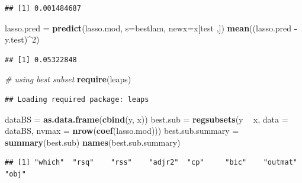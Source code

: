 \documentclass[]{article}
\newenvironment{Shaded}{\begin{snugshade}}{\end{snugshade}}
\newcommand{\KeywordTok}[1]{\textcolor[rgb]{0.13,0.29,0.53}{\textbf{#1}}}
\newcommand{\DataTypeTok}[1]{\textcolor[rgb]{0.13,0.29,0.53}{#1}}
\newcommand{\DecValTok}[1]{\textcolor[rgb]{0.00,0.00,0.81}{#1}}
\newcommand{\StringTok}[1]{\textcolor[rgb]{0.31,0.60,0.02}{#1}}
\newcommand{\CommentTok}[1]{\textcolor[rgb]{0.56,0.35,0.01}{\textit{#1}}}
\newcommand{\OperatorTok}[1]{\textcolor[rgb]{0.81,0.36,0.00}{\textbf{#1}}}
\newcommand{\NormalTok}[1]{#1}
\begin{document}
\begin{Shaded}
\end{Shaded}

\begin{verbatim}
## [1] 0.001484687
\end{verbatim}

\begin{Shaded}
\begin{Highlighting}[]
\NormalTok{lasso.pred =}\StringTok{ }\KeywordTok{predict}\NormalTok{(lasso.mod, }\DataTypeTok{s=}\NormalTok{bestlam, }\DataTypeTok{newx=}\NormalTok{x[test ,])}
\KeywordTok{mean}\NormalTok{((lasso.pred }\OperatorTok{-}\StringTok{ }\NormalTok{y.test)}\OperatorTok{^}\DecValTok{2}\NormalTok{)}
\end{Highlighting}
\end{Shaded}

\begin{verbatim}
## [1] 0.05322848
\end{verbatim}

\begin{Shaded}
\begin{Highlighting}[]
\CommentTok{# using best subset}
\KeywordTok{require}\NormalTok{(leaps)}
\end{Highlighting}
\end{Shaded}

\begin{verbatim}
## Loading required package: leaps
\end{verbatim}

\begin{Shaded}
\begin{Highlighting}[]
\NormalTok{dataBS =}\StringTok{ }\KeywordTok{as.data.frame}\NormalTok{(}\KeywordTok{cbind}\NormalTok{(y, x))}
\NormalTok{best.sub =}\StringTok{ }\KeywordTok{regsubsets}\NormalTok{(y }\OperatorTok{~}\StringTok{ }\NormalTok{x, }\DataTypeTok{data =}\NormalTok{ dataBS, }\DataTypeTok{nvmax =} \KeywordTok{nrow}\NormalTok{(}\KeywordTok{coef}\NormalTok{(lasso.mod)))}
\NormalTok{best.sub.summary =}\StringTok{ }\KeywordTok{summary}\NormalTok{(best.sub)}
\KeywordTok{names}\NormalTok{(best.sub.summary)}
\end{Highlighting}
\end{Shaded}

\begin{verbatim}
## [1] "which"  "rsq"    "rss"    "adjr2"  "cp"     "bic"    "outmat" "obj"
\end{verbatim}
\end{document}
